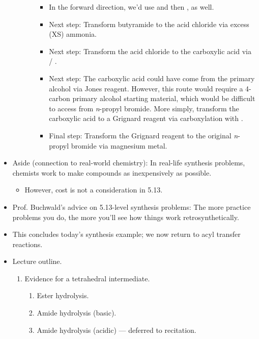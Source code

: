\documentclass[../notes.tex]{subfiles}
\begin{document}
\begin{itemize}
\begin{itemize}
\begin{itemize}
            \begin{itemize}
                \item In the forward direction, we'd use  and then , as well.
                \item Next step: Transform butyramide to the acid chloride via excess (XS) ammonia.
                \item Next step: Transform the acid chloride to the carboxylic acid via  / .
                \item Next step: The carboxylic acid could have come from the primary alcohol via Jones reagent. However, this route would require a 4-carbon primary alcohol starting material, which would be difficult to access from \emph{n}-propyl bromide. More simply, transform the carboxylic acid to a Grignard reagent via carboxylation with .
                \item Final step: Transform the Grignard reagent to the original \emph{n}-propyl bromide via magnesium metal.
            \end{itemize}
        \end{itemize}
    \end{itemize}
    \item Aside (connection to real-world chemistry): In real-life synthesis problems, chemists work to make compounds as inexpensively as possible.
    \begin{itemize}
        \item However, cost is not a consideration in 5.13.
    \end{itemize}
    \item Prof. Buchwald's advice on 5.13-level synthesis problems: The more practice problems you do, the more you'll see how things work retrosynthetically.
    \item This concludes today's synthesis example; we now return to acyl transfer reactions.
    \item Lecture outline.
    \begin{enumerate}[start=4]
        \item Evidence for a tetrahedral intermediate.
        \begin{enumerate}[label={\alph*.}]
            \item Ester hydrolysis.
            \item Amide hydrolysis (basic).
            \item Amide hydrolysis (acidic) --- deferred to recitation.
        \end{enumerate}

\end{enumerate}
\end{itemize}
\end{document}
